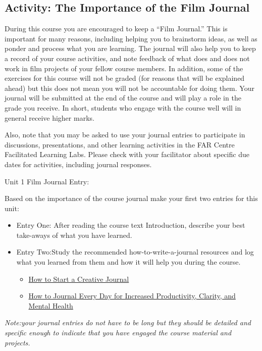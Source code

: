 \documentclass[
]{book}
\providecommand{\tightlist}{%
  \setlength{\itemsep}{0pt}\setlength{\parskip}{0pt}}
\begin{document}
\hypertarget{activity-the-importance-of-the-film-journal}{%
\subsection*{Activity: The Importance of the Film Journal}\label{activity-the-importance-of-the-film-journal}}

\begin{reflect}
During this course you are encouraged to keep a ``Film Journal.'' This is important for many reasons, including helping you to brainstorm ideas, as well as ponder and process what you are learning. The journal will also help you to keep a record of your course activities, and note feedback of what does and does not work in film projects of your fellow course members. In addition, some of the exercises for this course will not be graded (for reasons that will be explained ahead) but this does not mean you will not be accountable for doing them. Your journal will be submitted at the end of the course and will play a role in the grade you receive. In short, students who engage with the course well will in general receive higher marks.

Also, note that you may be asked to use your journal entries to participate in discussions, presentations, and other learning activities in the FAR Centre Facilitated Learning Labs. Please check with your facilitator about specific due dates for activities, including journal responses.

{Unit 1 Film Journal Entry:}

Based on the importance of the course journal make your first two entries for this unit:

\begin{itemize}
\tightlist
\item
  Entry One: After reading the course text Introduction, describe your best take-aways of what you have learned.
\item
  Entry Two:Study the recommended how-to-write-a-journal resources and log what you learned from them and how it will help you during the course.

  \begin{itemize}
  \tightlist
  \item
    \href{https://karenbanes.com/how-to-start-a-creative-journal/}{How to Start a Creative Journal}
  \item
    \href{https://www.youtube.com/watch?v=hUTWo7_W0lc}{How to Journal Every Day for Increased Productivity, Clarity, and Mental Health}
  \end{itemize}
\end{itemize}

\emph{Note:your journal entries do not have to be long but they should be detailed and specific enough to indicate that you have engaged the course material and projects.}
\end{reflect}
\end{document}
